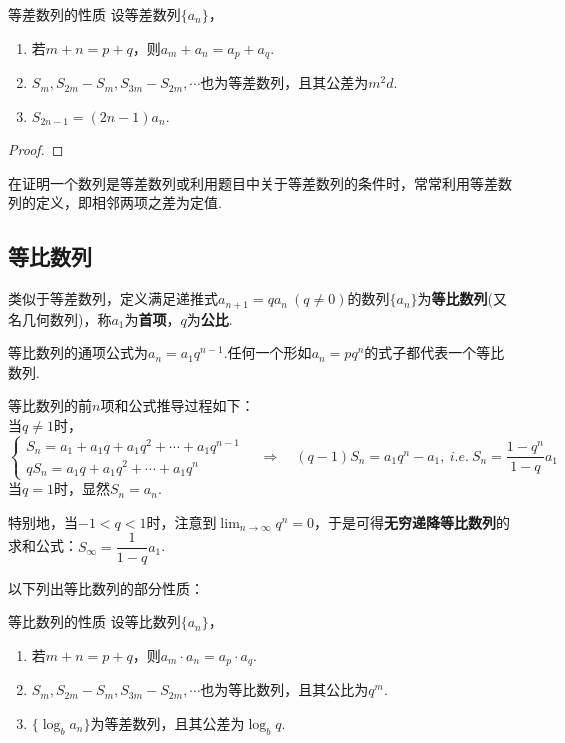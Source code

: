 \documentclass[lang=cn, zihao=5]{elegantbook}
\begin{document}
\begin{proposition}{等差数列的性质}
	设等差数列$\{ a_n \}$，
	\begin{enumerate}
		\item 若$m+n=p+q$，则$a_m+a_n=a_p+a_q$.
		\item $S_m,S_{2m}-S_m,S_{3m}-S_{2m},\cdots $也为等差数列，且其公差为$m^2d$.
		\item $S_{2n-1}=(2n-1)a_n$.
	\end{enumerate}
\end{proposition}
\begin{proof}
\end{proof}

在证明一个数列是等差数列或利用题目中关于等差数列的条件时，常常利用等差数列的定义，即相邻两项之差为定值.

\subsection{等比数列}

类似于等差数列，定义满足递推式$a_{n+1}=qa_n ~(q \neq 0)$的数列$\{ a_n \}$为\textbf{等比数列}(又名几何数列)，称$a_1$为\textbf{首项}，$q$为\textbf{公比}.

等比数列的通项公式为$a_n = a_1 q^{n-1}$.任何一个形如$a_n=pq^n$的式子都代表一个等比数列.

等比数列的前$n$项和公式推导过程如下： \\
当$q \neq 1$时，
$$\begin{cases}
	S_n = a_1 + a_1q + a_1q^2 + \cdots + a_1q^{n-1} \\
	qS_n = a_1q + a_1q^2 + \cdots + a_1q^{n} 
\end{cases}
\quad \Longrightarrow \quad
(q-1)S_n = a_1q^{n} - a_1,~i.e.~S_n = \frac{1-q^n}{1-q} a_1
$$
当$q = 1$时，显然$S_n = a_n$.

特别地，当$-1<q<1$时，注意到$\lim _{n \to \infty} q^n=0$，于是可得\textbf{无穷递降等比数列}的求和公式：$S_{\infty} = \dfrac{1}{1-q}a_1$.

以下列出等比数列的部分性质：

\begin{proposition}{等比数列的性质}
	设等比数列$\{ a_n \}$，
	\begin{enumerate}
		\item 若$m+n=p+q$，则$a_m \cdot a_n = a_p \cdot a_q$.
		\item $S_m,S_{2m}-S_m,S_{3m}-S_{2m},\cdots $也为等比数列，且其公比为$q^{m}$.
		\item $\{ \log _{b}{a_n} \}$为等差数列，且其公差为$\log _{b}{q}$.
	\end{enumerate}
\end{proposition}
\end{document}
